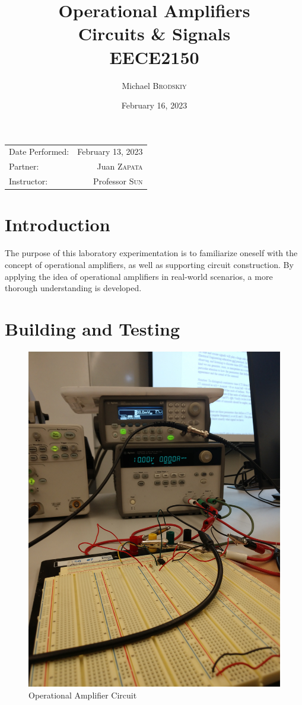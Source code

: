 \documentclass[
	letterpaper, %
	10pt, %
]{CSUniSchoolLabReport}
\title{Operational Amplifiers \\ Circuits \& Signals \\ EECE2150} %
\author{Michael \textsc{Brodskiy}}
\date{February 16, 2023} %
\begin{document}
\maketitle %

\begin{center}
	\begin{tabular}{l r}
		Date Performed: & February 13, 2023 \\ %
        Partner: & Juan \textsc{Zapata} \\ %
		Instructor: & Professor \textsc{Sun} %
	\end{tabular}
\end{center}

\setcounter{section}{-1}

\section{Introduction}

The purpose of this laboratory experimentation is to familiarize oneself with the concept of operational amplifiers, as well as supporting circuit construction. By applying the idea of operational amplifiers in real-world scenarios, a more thorough understanding is developed.

\section{Building and Testing}

\begin{figure}[H]
  \centering
  \includegraphics[width=.9\textwidth,angle=270]{Figures/L6Circ}
  \caption{Operational Amplifier Circuit}
  \label{fig:1}
\end{figure}
\end{document}
